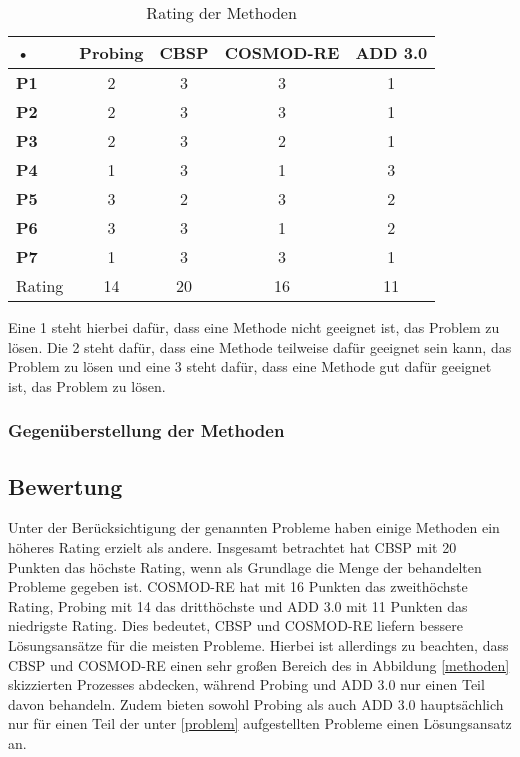 \begin{table}[h] %
\caption{Rating der Methoden}
\centering
\begin{tabular}{|l|c|c|c|c|}
\hline 
• & \textbf{Probing} & \textbf{CBSP} & \textbf{COSMOD-RE} & \textbf{ADD 3.0} \\ 
\hline 
\textbf{P1} & 2 & 3 & 3 & 1 \\ 
\hline 
\textbf{P2} & 2 & 3 & 3 & 1 \\ 
\hline 
\textbf{P3} & 2 & 3 & 2 & 1 \\ 
\hline 
\textbf{P4} & 1 & 3 & 1 & 3 \\ 
\hline 
\textbf{P5} & 3 & 2 & 3 & 2 \\ 
\hline 
\textbf{P6} & 3 & 3 & 1 & 2 \\ 
\hline 
\textbf{P7} & 1 & 3 & 3 & 1 \\ 
\hline 
\hline 
Rating & 14 & 20 & 16 & 11 \\ 
\hline 
\end{tabular} 
\label{tab:method_rating}
\end{table}

Eine 1 steht hierbei daf\"ur, dass eine Methode nicht geeignet ist, das Problem zu l\"osen. Die 2 steht daf\"ur, dass eine Methode teilweise daf\"ur geeignet sein kann, das Problem zu l\"osen und eine 3 steht daf\"ur, dass eine Methode gut daf\"ur geeignet ist, das Problem zu l\"osen.\\





\subsubsection{Gegen\"uberstellung der Methoden}





\subsection{Bewertung}
Unter der Ber\"ucksichtigung der genannten Probleme haben einige Methoden ein h\"oheres Rating erzielt als andere. Insgesamt betrachtet hat CBSP mit 20 Punkten das h\"ochste Rating, wenn als Grundlage die Menge der behandelten Probleme gegeben ist. COSMOD-RE hat mit 16 Punkten das zweith\"ochste Rating, Probing mit 14 das dritth\"ochste und ADD 3.0 mit 11 Punkten das niedrigste Rating. Dies bedeutet, CBSP und COSMOD-RE liefern bessere L\"osungsans\"atze f\"ur die meisten Probleme. Hierbei ist allerdings zu beachten, dass CBSP und COSMOD-RE einen sehr gro\ss{}en Bereich des in Abbildung \ref{methoden} skizzierten Prozesses abdecken, w\"ahrend Probing und ADD 3.0 nur einen Teil davon behandeln. Zudem bieten sowohl Probing als auch ADD 3.0 haupts\"achlich nur f\"ur einen Teil der unter \ref{problem} aufgestellten Probleme einen L\"osungsansatz an. \\

